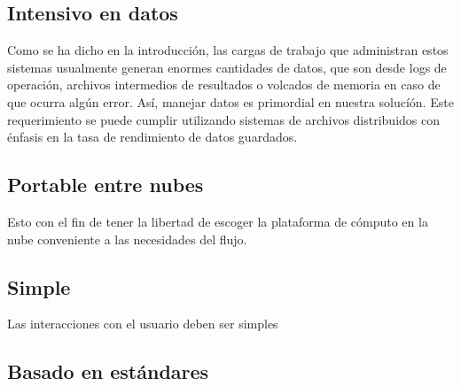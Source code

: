 \subsection{Intensivo en datos}

Como se ha dicho en la introducción, las cargas de trabajo que administran estos sistemas usualmente generan enormes cantidades de datos, que son desde logs de operación, archivos intermedios de resultados o volcados de memoria en caso de que ocurra algún error. Así, manejar datos es primordial en nuestra solucíón. Este requerimiento se puede cumplir utilizando sistemas de archivos distribuidos con énfasis en la tasa de rendimiento de datos guardados.


\subsection{Portable entre nubes}

Esto con el fin de tener la libertad de escoger la plataforma de cómputo en la nube conveniente a las necesidades del flujo.


\subsection{Simple}

Las interacciones con el usuario deben ser simples



\subsection{Basado en estándares}
